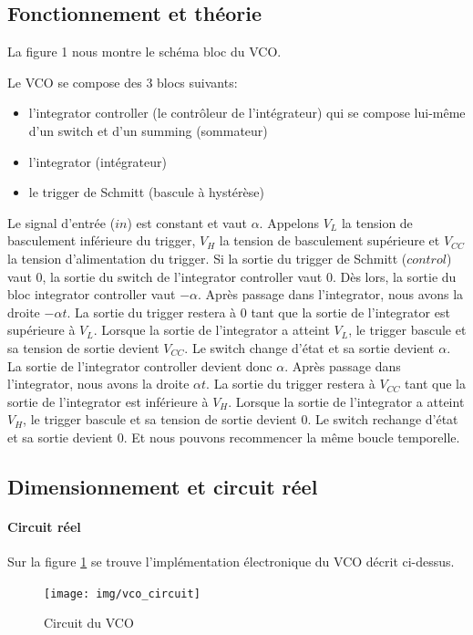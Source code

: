
\subsection{Fonctionnement et théorie}
La figure 1 nous montre le schéma bloc du VCO.
                                                                                                                                                                   

Le VCO se compose des 3 blocs suivants:
\begin{itemize}
\item l'integrator controller (le contrôleur de l'intégrateur) qui se compose lui-même d'un switch et d'un summing (sommateur)
\item l'integrator (intégrateur)
\item le trigger de Schmitt (bascule à hystérèse)
\end{itemize}

Le signal d'entrée ($in$) est constant et vaut $\alpha$. Appelons $V_L$ la tension de basculement inférieure du trigger, $V_H$ la tension de basculement supérieure et $V_{CC}$ la tension d'alimentation du trigger.
Si la sortie du trigger de Schmitt ($control$) vaut $0$, la sortie du switch de l'integrator controller vaut $0$. Dès lors, la sortie du bloc integrator controller vaut $-\alpha$.  Après passage dans l'integrator, nous avons la droite $-\alpha t$. La sortie du trigger restera à $0$ tant que la sortie de l'integrator est supérieure à $V_L$. Lorsque la sortie de l'integrator a atteint $V_L$, le trigger bascule et sa tension de sortie devient $V_{CC}$. Le switch change d'état et sa sortie devient $\alpha$. La sortie de l'integrator controller devient donc $\alpha$. Après passage dans l'integrator, nous avons la droite $\alpha t$. La sortie du trigger restera à $V_{CC}$ tant que la sortie de l'integrator est inférieure à $V_H$. Lorsque la sortie de l'integrator a atteint $V_H$, le trigger bascule et sa tension de sortie devient $0$. Le switch rechange d'état et sa sortie devient $0$. Et nous pouvons recommencer la même boucle temporelle.

\subsection{Dimensionnement et circuit réel}
\paragraph{Circuit réel}
Sur la figure \ref{fig:circuit_vco} se trouve l'implémentation électronique du VCO décrit ci-dessus.
\begin{figure}[ht]
\centering
\texttt{[image: img/vco\_circuit]}
\caption{Circuit du VCO}
\label{fig:circuit_vco}
\end{figure}

